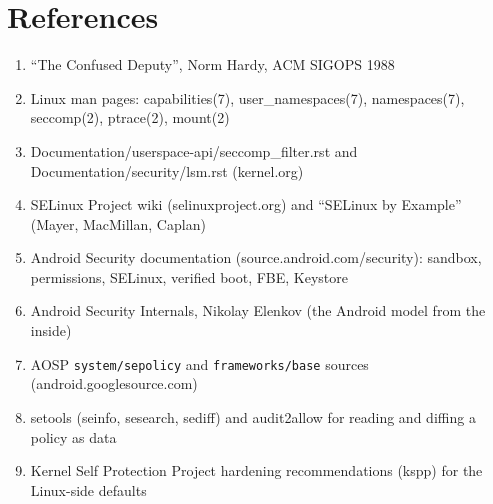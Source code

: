 \documentclass[12pt]{Training}
\begin{document}
\section*{References}
\begin{enumerate}
	\item ``The Confused Deputy'', Norm Hardy, ACM SIGOPS 1988
	\item Linux man pages: capabilities(7), user\_namespaces(7), namespaces(7), seccomp(2), ptrace(2), mount(2)
	\item Documentation/userspace-api/seccomp\_filter.rst and Documentation/security/lsm.rst (kernel.org)
	\item SELinux Project wiki (selinuxproject.org) and ``SELinux by Example'' (Mayer, MacMillan, Caplan)
	\item Android Security documentation (source.android.com/security): sandbox, permissions, SELinux, verified boot, FBE, Keystore
	\item Android Security Internals, Nikolay Elenkov (the Android model from the inside)
	\item AOSP \lstinline{system/sepolicy} and \lstinline{frameworks/base} sources (android.googlesource.com)
	\item setools (seinfo, sesearch, sediff) and audit2allow for reading and diffing a policy as data
	\item Kernel Self Protection Project hardening recommendations (kspp) for the Linux-side defaults
\end{enumerate}
\end{document}
